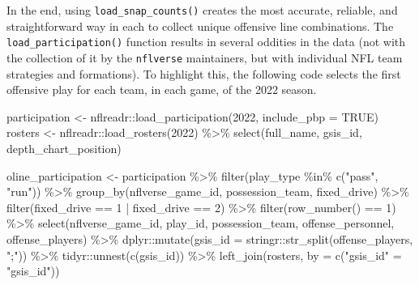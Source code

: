 \documentclass[
  letterpaper,
]{krantz}
\newenvironment{Shaded}{\begin{snugshade}}{\end{snugshade}}
\newcommand{\AttributeTok}[1]{\textcolor[rgb]{0.40,0.45,0.13}{#1}}
\newcommand{\ConstantTok}[1]{\textcolor[rgb]{0.56,0.35,0.01}{#1}}
\newcommand{\DecValTok}[1]{\textcolor[rgb]{0.68,0.00,0.00}{#1}}
\newcommand{\FunctionTok}[1]{\textcolor[rgb]{0.28,0.35,0.67}{#1}}
\newcommand{\NormalTok}[1]{\textcolor[rgb]{0.00,0.23,0.31}{#1}}
\newcommand{\OtherTok}[1]{\textcolor[rgb]{0.00,0.23,0.31}{#1}}
\newcommand{\SpecialCharTok}[1]{\textcolor[rgb]{0.37,0.37,0.37}{#1}}
\newcommand{\StringTok}[1]{\textcolor[rgb]{0.13,0.47,0.30}{#1}}
\begin{document}
In the end, using \texttt{load\_snap\_counts()} creates the most
accurate, reliable, and straightforward way in each to collect unique
offensive line combinations. The \texttt{load\_participation()} function
results in several oddities in the data (not with the collection of it
by the \texttt{nflverse} maintainers, but with individual NFL team
strategies and formations). To highlight this, the following code
selects the first offensive play for each team, in each game, of the
2022 season.

\begin{Shaded}
\begin{Highlighting}[]
\NormalTok{participation }\OtherTok{\textless{}{-}}\NormalTok{ nflreadr}\SpecialCharTok{::}\FunctionTok{load\_participation}\NormalTok{(}\DecValTok{2022}\NormalTok{, }\AttributeTok{include\_pbp =} \ConstantTok{TRUE}\NormalTok{)}
\NormalTok{rosters }\OtherTok{\textless{}{-}}\NormalTok{ nflreadr}\SpecialCharTok{::}\FunctionTok{load\_rosters}\NormalTok{(}\DecValTok{2022}\NormalTok{) }\SpecialCharTok{\%\textgreater{}\%}
  \FunctionTok{select}\NormalTok{(full\_name, gsis\_id, depth\_chart\_position)}

\NormalTok{oline\_participation }\OtherTok{\textless{}{-}}\NormalTok{ participation }\SpecialCharTok{\%\textgreater{}\%}
  \FunctionTok{filter}\NormalTok{(play\_type }\SpecialCharTok{\%in\%} \FunctionTok{c}\NormalTok{(}\StringTok{"pass"}\NormalTok{, }\StringTok{"run"}\NormalTok{)) }\SpecialCharTok{\%\textgreater{}\%}
  \FunctionTok{group\_by}\NormalTok{(nflverse\_game\_id, possession\_team, fixed\_drive) }\SpecialCharTok{\%\textgreater{}\%}
  \FunctionTok{filter}\NormalTok{(fixed\_drive }\SpecialCharTok{==} \DecValTok{1} \SpecialCharTok{|}\NormalTok{ fixed\_drive }\SpecialCharTok{==} \DecValTok{2}\NormalTok{) }\SpecialCharTok{\%\textgreater{}\%}
  \FunctionTok{filter}\NormalTok{(}\FunctionTok{row\_number}\NormalTok{() }\SpecialCharTok{==} \DecValTok{1}\NormalTok{) }\SpecialCharTok{\%\textgreater{}\%}
  \FunctionTok{select}\NormalTok{(nflverse\_game\_id, play\_id, possession\_team, }
\NormalTok{         offense\_personnel, offense\_players) }\SpecialCharTok{\%\textgreater{}\%}
\NormalTok{  dplyr}\SpecialCharTok{::}\FunctionTok{mutate}\NormalTok{(}\AttributeTok{gsis\_id =}\NormalTok{ stringr}\SpecialCharTok{::}\FunctionTok{str\_split}\NormalTok{(offense\_players, }\StringTok{";"}\NormalTok{)) }\SpecialCharTok{\%\textgreater{}\%}
\NormalTok{  tidyr}\SpecialCharTok{::}\FunctionTok{unnest}\NormalTok{(}\FunctionTok{c}\NormalTok{(gsis\_id)) }\SpecialCharTok{\%\textgreater{}\%}
  \FunctionTok{left\_join}\NormalTok{(rosters, }\AttributeTok{by =} \FunctionTok{c}\NormalTok{(}\StringTok{"gsis\_id"} \OtherTok{=} \StringTok{"gsis\_id"}\NormalTok{))}


\end{Highlighting}
\end{Shaded}
\end{document}
